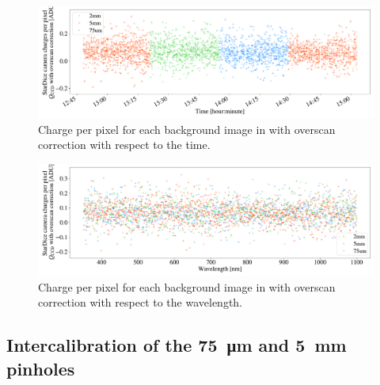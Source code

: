 
\begin{figure}[h]
    \centering
    \includegraphics[width=\columnwidth]{fig/background_stationary_time.pdf}
    \caption{Charge per pixel for each background image in \SD with overscan correction with respect to the time.}
    \label{fig:stationarity_time}
\end{figure}

\begin{figure}[h]
    \centering
    \includegraphics[width=\columnwidth]{fig/background_stationary_wavelength.pdf}
    \caption{Charge per pixel for each background image in \SD with overscan correction with respect to the wavelength.}
    \label{fig:stationarity_wl}
\end{figure}


\subsection{Intercalibration of the \SI{75}{\micro\meter} and \SI{5}{\mm} pinholes}

